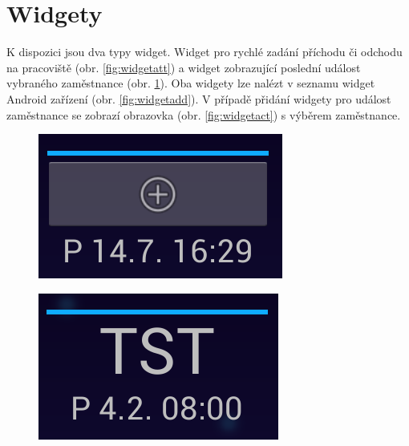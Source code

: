 \documentclass{diplomka}
\begin{document}
\section{Widgety}
K dispozici jsou dva typy widget. Widget pro rychlé zadání příchodu či odchodu na pracoviště (obr. \ref{fig:widgetatt}) a widget zobrazující poslední událost vybraného zaměstnance (obr. \ref{fig:widgetemp}). Oba widgety lze nalézt v seznamu widget Android zařízení (obr. \ref{fig:widgetadd}). V případě přidání widgety pro událost zaměstnance se zobrazí obrazovka (obr. \ref{fig:widgetact}) s výběrem zaměstnance.
\begin{figure}[H]
\centering

\begin{minipage}{.45\textwidth}
  \centering
  \includegraphics[width=.9\linewidth]{obr/widgetatt.png}
  \label{fig:widgetatt}
\end{minipage}\hfill%
\begin{minipage}{.45\textwidth}
  \centering
  \includegraphics[width=.9\linewidth]{obr/widgetemp.png}
  \label{fig:widgetemp}
\end{minipage}
\end{figure}
\end{document}
